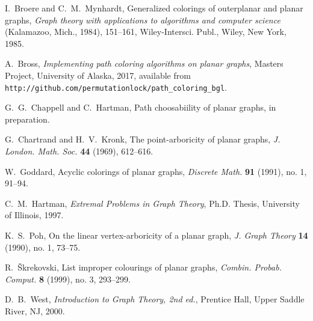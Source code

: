 \documentclass[12pt,letterpaper]{article}
\theoremstyle{plain}
\theoremstyle{definition}
\begin{document}
\begin{thebibliography}{99}

I.~Broere and C.~M.~Mynhardt,
Generalized colorings of outerplanar and planar graphs,
\textit{Graph theory with applications to algorithms and computer science}
 (Kalamazoo, Mich., 1984),
151--161,
Wiley-Intersci. Publ., Wiley, New York, 1985.

A.~Bross,
\textit{Implementing path coloring algorithms on planar graphs},
Masters Project,
University of Alaska,
2017,
available from\hfil\break
\texttt{http://github.com/permutationlock/path\_coloring\_bgl}.

G.~G.~Chappell and C.~Hartman,
Path choosabiility of planar graphs,
in preparation.

G.~Chartrand and H.~V.~Kronk,
The point-arboricity of planar graphs,
\textit{J. London. Math. Soc.}
\textbf{44} (1969),
612--616.

W.~Goddard,
Acyclic colorings of planar graphs,
\textit{Discrete Math.}
\textbf{91} (1991), no. 1,
91--94.

C.~M.~Hartman,
\textit{Extremal Problems in Graph Theory},
Ph.D. Thesis,
University of Illinois,
1997.

K.~S.~Poh,
On the linear vertex-arboricity of a planar graph,
\textit{J. Graph Theory}
\textbf{14} (1990), no. 1,
73--75.

R.~\v{S}krekovski,
List improper colourings of planar graphs,
\textit{Combin. Probab. Comput.}
\textbf{8} (1999), no. 3,
293--299.

D.~B.~West,
\textit{Introduction to Graph Theory, 2nd ed.},
Prentice Hall,
Upper Saddle River, NJ,
2000.

\end{thebibliography}
\end{document}
